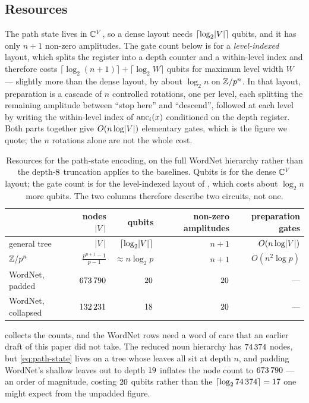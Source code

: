 \subsection{Resources}
\label{subsec:resources}

The path state lives in $\mathbb{C}^{V}$, so a dense layout needs
$\lceil \log_2 \lvert V\rvert \rceil$ qubits, and it has only $n+1$ non-zero amplitudes. The
gate count below is for a \emph{level-indexed} layout, which splits the register into a
depth counter and a within-level index and therefore costs
$\lceil \log_2 (n+1) \rceil + \lceil \log_2 W \rceil$ qubits for maximum level width
$W$ --- slightly more than the dense layout, by about $\log_2 n$ on $\mathbb{Z}/p^{n}$. In that
layout, preparation is a cascade of $n$
controlled rotations, one per level, each splitting the remaining amplitude between
``stop here'' and ``descend'', followed at each level by writing the within-level index
of $\operatorname{anc}_i(x)$ conditioned on the depth register. Both parts together give
$O(n \log \lvert V\rvert)$ elementary gates, which is the figure we quote; the $n$ rotations
alone are not the whole cost.

\begin{table}
  \centering
  \caption{Resources for the path-state encoding, on the full WordNet hierarchy rather
    than the depth-$8$ truncation  applies to the
    baselines. Qubits is for the dense $\mathbb{C}^{V}$ layout; the gate count is for the
    level-indexed layout of , which costs about $\log_2 n$ more
    qubits. The two columns therefore describe two circuits, not one.}
  \label{tab:resources}
  \begin{tabular}{lrrrr}
    \toprule
    & nodes $\lvert V\rvert$ & qubits & non-zero amplitudes & preparation gates \\
    \midrule
    general tree & $\lvert V\rvert$ & $\lceil \log_2 \lvert V\rvert \rceil$ & $n+1$
      & $O(n \log \lvert V\rvert)$ \\
    $\mathbb{Z}/p^{n}$ & $\frac{p^{n+1}-1}{p-1}$ & $\approx n \log_2 p$ & $n+1$ & $O(n^{2}\log p)$ \\
    WordNet, padded & $673\,790$ & $20$ & $20$ & --- \\
    WordNet, collapsed & $132\,231$ & $18$ & $20$
      & --- \\
    \bottomrule
  \end{tabular}
\end{table}

 collects the counts, and the WordNet rows need a word of care that
an earlier draft of this paper did not take. The reduced noun hierarchy has
$74\,374$ nodes, but \cref{eq:path-state} lives on a tree whose leaves all sit at
depth $n$, and padding WordNet's shallow leaves out to depth $19$ inflates the
node count to $673\,790$ --- an order of magnitude, costing
$20$ qubits rather than the $\lceil \log_2 74\,374 \rceil = 17$ one
might expect from the unpadded figure.


